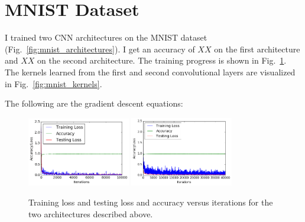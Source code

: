 \documentclass[5pt]{article}
\begin{document}
\section{MNIST Dataset}
I trained two CNN architectures on the MNIST dataset
(Fig.~\ref{fig:mnist_architectures}). I get an accuracy of $XX$ on the first
architecture and $XX$ on the second architecture. The training progress is
shown in Fig.~\ref{fig:mnist_learning}. The kernels learned from the first and
second convolutional layers are visualized in Fig.~\ref{fig:mnist_kernels}.

The following are the gradient descent equations:

\begin{figure}[T]
  \centering{}
  \includegraphics[width=0.4\textwidth]{images/mnist_learning1.png}
  \includegraphics[width=0.4\textwidth]{images/mnist_learning2.png}
  \caption{Training loss and testing loss and accuracy versus iterations for
  the two architectures described above.}
\label{fig:mnist_learning}
\end{figure}
\end{document}
